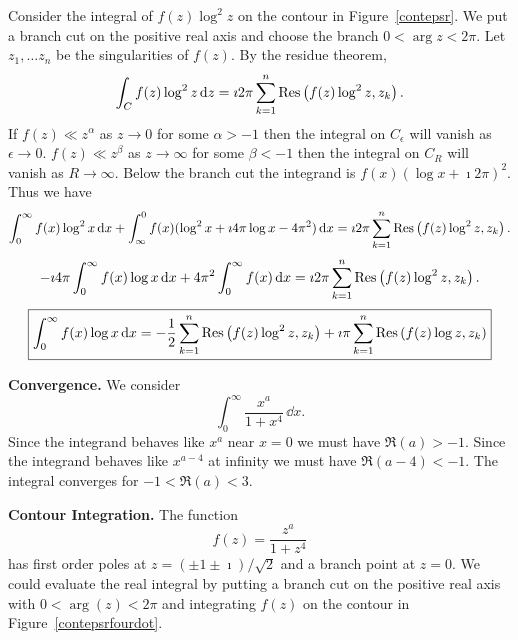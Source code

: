 {%
\begin{Solution}
  \label{solution f(x) log x}
  Consider the integral of $f(z) \log^2 z$ on the contour in 
  Figure~\ref{contepsr}.  We put a branch cut on the positive real axis and 
  choose the branch $0 < \arg z < 2 \pi$.
  Let $z_1, \ldots z_n$ be the singularities of $f(z)$.  By the residue theorem,
  \[
  \int_C f(z) \log^2 z \,\mathrm{d} z 
  = \imath 2 \pi \sum_{k=1}^n \mathop{\mathrm{Res}}\nolimits \left( f(z) \log^2 z, z_k \right).
  \]
  If $f(z) \ll z^\alpha$ as $z \to 0$ for some $\alpha > -1$ then the integral
  on $C_\epsilon$ will vanish as $\epsilon \to 0$. 
  $f(z) \ll z^\beta$ as $z \to \infty$ for some $\beta < -1$ then the integral
  on $C_R$ will vanish as $R \to \infty$.   Below the branch cut the integrand
  is $f(x) (\log x + \imath 2 \pi)^2$.  Thus we have
  \[
  \int_0^\infty f(x) \log^2 x \,\mathrm{d} x 
  + \int_\infty^0 f(x) (\log^2 x + \imath 4 \pi \log x - 4 \pi^2) \,\mathrm{d} x
  = \imath 2 \pi \sum_{k=1}^n \mathop{\mathrm{Res}}\nolimits \left( f(z) \log^2 z, z_k \right).
  \]
  \[
  - \imath 4 \pi \int_0^\infty f(x) \log x \,\mathrm{d} x + 4 \pi^2 \int_0^\infty f(x) \,\mathrm{d} x
  = \imath 2 \pi \sum_{k=1}^n \mathop{\mathrm{Res}}\nolimits \left( f(z) \log^2 z, z_k \right).
  \]
  \[
  \boxed{
    \int_0^\infty f(x) \log x \,\mathrm{d} x 
    = - \frac{1}{2} \sum_{k=1}^n \mathop{\mathrm{Res}}\nolimits \left( f(z) \log^2 z, z_k \right)
    + \imath \pi \sum_{k=1}^n \mathop{\mathrm{Res}}\nolimits \left( f(z) \log z, z_k \right)
    }
  \]
\end{Solution}


















\begin{Solution}
  \label{solution x^a/(1+x^4)}
  \textbf{Convergence.}
  We consider
  \[
  \int_0^\infty \frac{x^a}{1 + x^4} \,\dd x.
  \]
  Since the integrand behaves like $x^a$ near $x = 0$ we must have
  $\Re(a) > -1$.  Since the integrand behaves like $x^{a-4}$ at infinity
  we must have $\Re(a-4) < -1$.  The integral converges for
  $-1 < \Re(a) < 3$.

  \textbf{Contour Integration.}
  The function
  \[
  f(z) = \frac{ z^a }{ 1 + z^4 }
  \]
  has first order poles at $z = (\pm 1 \pm \imath) / \sqrt{2}$ and
  a branch point at $z = 0$.  We could evaluate the real integral by
  putting a branch cut on the positive real axis with
  $0 < \arg(z) < 2 \pi$ and integrating $f(z)$ on the contour in
  Figure~\ref{contepsrfourdot}.


\end{Solution}}
